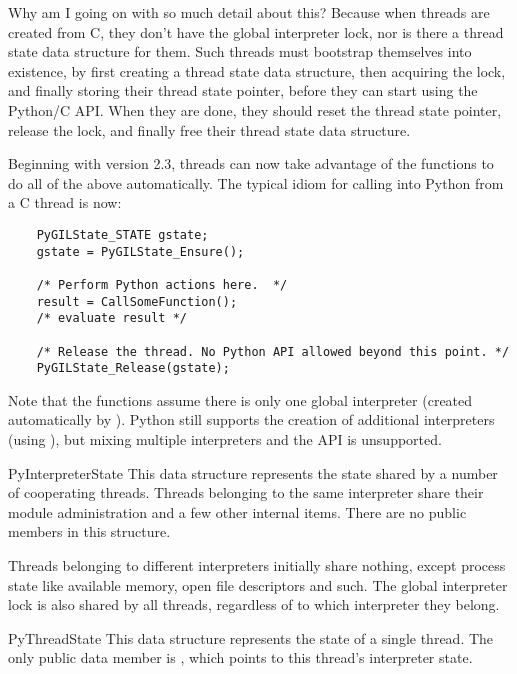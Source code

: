 Why am I going on with so much detail about this?  Because when
threads are created from C, they don't have the global interpreter
lock, nor is there a thread state data structure for them.  Such
threads must bootstrap themselves into existence, by first creating a
thread state data structure, then acquiring the lock, and finally
storing their thread state pointer, before they can start using the
Python/C API.  When they are done, they should reset the thread state
pointer, release the lock, and finally free their thread state data
structure.

Beginning with version 2.3, threads can now take advantage of the 
 functions to do all of the above
automatically.  The typical idiom for calling into Python from a C
thread is now:

\begin{verbatim}
    PyGILState_STATE gstate;
    gstate = PyGILState_Ensure();

    /* Perform Python actions here.  */
    result = CallSomeFunction();
    /* evaluate result */

    /* Release the thread. No Python API allowed beyond this point. */
    PyGILState_Release(gstate);
\end{verbatim}

Note that the  functions assume there is only
one global  interpreter (created automatically by
).  Python still supports the creation of
additional interpreters  (using ), but
mixing multiple interpreters and the  API is
unsupported.

\begin{ctypedesc}{PyInterpreterState}
  This data structure represents the state shared by a number of
  cooperating threads.  Threads belonging to the same interpreter
  share their module administration and a few other internal items.
  There are no public members in this structure.

  Threads belonging to different interpreters initially share nothing,
  except process state like available memory, open file descriptors
  and such.  The global interpreter lock is also shared by all
  threads, regardless of to which interpreter they belong.
\end{ctypedesc}

\begin{ctypedesc}{PyThreadState}
  This data structure represents the state of a single thread.  The
  only public data member is , which points to this thread's interpreter state.
\end{ctypedesc}

